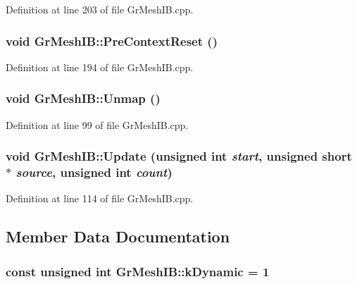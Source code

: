Definition at line 203 of file GrMeshIB.cpp.\hypertarget{class_gr_mesh_i_b_ba75408bf6d0944191a4369bcfffb40a}{
\subsubsection[{PreContextReset}]{\setlength{\rightskip}{0pt plus 5cm}void GrMeshIB::PreContextReset ()}}
\label{class_gr_mesh_i_b_ba75408bf6d0944191a4369bcfffb40a}




Definition at line 194 of file GrMeshIB.cpp.\hypertarget{class_gr_mesh_i_b_8151cb6061c284305d8c99c091216bdd}{
\subsubsection[{Unmap}]{\setlength{\rightskip}{0pt plus 5cm}void GrMeshIB::Unmap ()}}
\label{class_gr_mesh_i_b_8151cb6061c284305d8c99c091216bdd}




Definition at line 99 of file GrMeshIB.cpp.\hypertarget{class_gr_mesh_i_b_86bca7ecd874edc1a9dff554efbbec28}{
\subsubsection[{Update}]{\setlength{\rightskip}{0pt plus 5cm}void GrMeshIB::Update (unsigned int {\em start}, \/  unsigned short $\ast$ {\em source}, \/  unsigned int {\em count})}}
\label{class_gr_mesh_i_b_86bca7ecd874edc1a9dff554efbbec28}




Definition at line 114 of file GrMeshIB.cpp.

\subsection{Member Data Documentation}
\hypertarget{class_gr_mesh_i_b_5793b340a735f6ef818f74e6727fcf00}{
\subsubsection[{kDynamic}]{\setlength{\rightskip}{0pt plus 5cm}const unsigned int {\bf GrMeshIB::kDynamic} = 1}}
\label{class_gr_mesh_i_b_5793b340a735f6ef818f74e6727fcf00}




